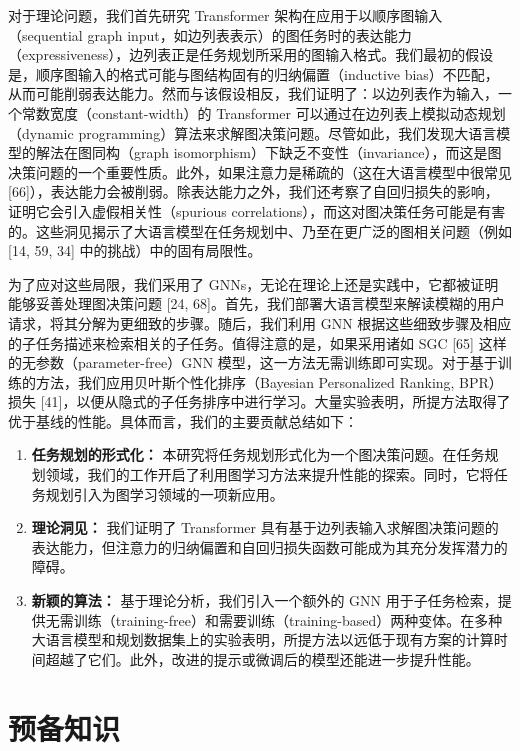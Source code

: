 \documentclass[11pt,UTF8,fontset=fandol]{ctexart}
\begin{document}
对于理论问题，我们首先研究 Transformer 架构在应用于以顺序图输入（sequential graph input，如边列表表示）的图任务时的表达能力（expressiveness），边列表正是任务规划所采用的图输入格式。我们最初的假设是，顺序图输入的格式可能与图结构固有的归纳偏置（inductive bias）不匹配，从而可能削弱表达能力。然而与该假设相反，我们证明了：以边列表作为输入，一个常数宽度（constant-width）的 Transformer 可以通过在边列表上模拟动态规划（dynamic programming）算法来求解图决策问题。尽管如此，我们发现大语言模型的解法在图同构（graph isomorphism）下缺乏不变性（invariance），而这是图决策问题的一个重要性质。此外，如果注意力是稀疏的（这在大语言模型中很常见 [66]），表达能力会被削弱。除表达能力之外，我们还考察了自回归损失的影响，证明它会引入虚假相关性（spurious correlations），而这对图决策任务可能是有害的。这些洞见揭示了大语言模型在任务规划中、乃至在更广泛的图相关问题（例如 [14, 59, 34] 中的挑战）中的固有局限性。

为了应对这些局限，我们采用了 GNNs，无论在理论上还是实践中，它都被证明能够妥善处理图决策问题 [24, 68]。首先，我们部署大语言模型来解读模糊的用户请求，将其分解为更细致的步骤。随后，我们利用 GNN 根据这些细致步骤及相应的子任务描述来检索相关的子任务。值得注意的是，如果采用诸如 SGC [65] 这样的无参数（parameter-free）GNN 模型，这一方法无需训练即可实现。对于基于训练的方法，我们应用贝叶斯个性化排序（Bayesian Personalized Ranking, BPR）损失 [41]，以便从隐式的子任务排序中进行学习。大量实验表明，所提方法取得了优于基线的性能。具体而言，我们的主要贡献总结如下：

\begin{enumerate}[leftmargin=2em]
    \item \textbf{任务规划的形式化：} 本研究将任务规划形式化为一个图决策问题。在任务规划领域，我们的工作开启了利用图学习方法来提升性能的探索。同时，它将任务规划引入为图学习领域的一项新应用。
    \item \textbf{理论洞见：} 我们证明了 Transformer 具有基于边列表输入求解图决策问题的表达能力，但注意力的归纳偏置和自回归损失函数可能成为其充分发挥潜力的障碍。
    \item \textbf{新颖的算法：} 基于理论分析，我们引入一个额外的 GNN 用于子任务检索，提供无需训练（training-free）和需要训练（training-based）两种变体。在多种大语言模型和规划数据集上的实验表明，所提方法以远低于现有方案的计算时间超越了它们。此外，改进的提示或微调后的模型还能进一步提升性能。
\end{enumerate}

\section{预备知识}
\end{document}
